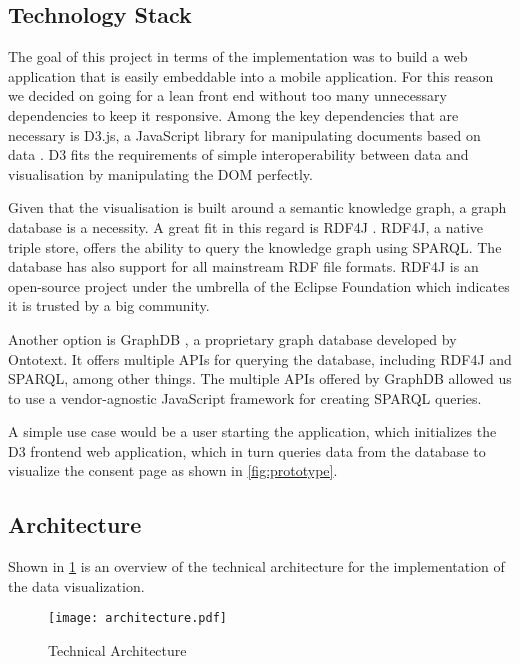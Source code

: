 \documentclass[../paper.tex]{subfiles}
\begin{document}
  \subsection{Technology Stack}

  The goal of this project in terms of the implementation was to
  build a web application that is easily embeddable into a mobile application.
  For this reason we decided on going for a lean front end without too many
  unnecessary dependencies to keep it responsive. Among the key dependencies that
  are necessary is D3.js, a JavaScript library for manipulating documents based
  on data \cite{d3}. D3 fits the requirements of simple interoperability between
  data and visualisation by manipulating the DOM perfectly.

  Given that the
  visualisation is built around a semantic knowledge graph, a graph database is
  a necessity.
  A great fit in this regard is RDF4J \cite{rdf4j}. RDF4J, a native triple
  store, offers the ability to query the knowledge graph using SPARQL. The
  database has also support for all mainstream RDF file formats.
  RDF4J is an open-source project under the umbrella of the Eclipse Foundation
  which indicates it is trusted by a big community.

  Another option is GraphDB \cite{graphdb}, a proprietary graph database developed by Ontotext.
  It offers multiple APIs for querying the database, including RDF4J and SPARQL,
  among other things. The multiple APIs offered by
  GraphDB allowed us to use a vendor-agnostic JavaScript framework for
  creating SPARQL queries.

  A simple use case would be a user starting the application, which initializes
  the D3 frontend web application, which in turn queries data from the database
  to visualize the consent page as shown in \cref{fig:prototype}.

  \subsection{Architecture}

  Shown in \cref{fig:architecture} is an overview of the technical architecture
  for the implementation of the data visualization.

  \begin{figure}
    \centering
    \texttt{[image: architecture.pdf]}
    \caption{Technical Architecture}
    \label{fig:architecture}
  \end{figure}
\end{document}
